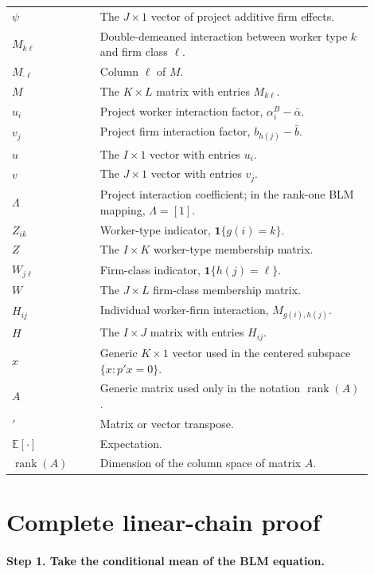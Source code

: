 \documentclass[11pt]{article}
\newcommand{\E}{\mathbb E}
\newcommand{\rank}{\operatorname{rank}}
\begin{document}
\begin{longtable}{
  >{\raggedright\arraybackslash}p{0.22\linewidth}
  >{\raggedright\arraybackslash}p{0.68\linewidth}}
\(\psi\) & The \(J\times1\) vector of project additive firm effects. \\
\(M_{k\ell}\) & Double-demeaned interaction between worker type \(k\) and firm class \(\ell\). \\
\(M_{\cdot\ell}\) & Column \(\ell\) of \(M\). \\
\(M\) & The \(K\times L\) matrix with entries \(M_{k\ell}\). \\
\(u_i\) & Project worker interaction factor, \(\alpha_i^B-\bar\alpha\). \\
\(v_j\) & Project firm interaction factor, \(b_{h(j)}-\bar b\). \\
\(u\) & The \(I\times1\) vector with entries \(u_i\). \\
\(v\) & The \(J\times1\) vector with entries \(v_j\). \\
\(\Lambda\) & Project interaction coefficient; in the rank-one BLM mapping, \(\Lambda=[1]\). \\
\(Z_{ik}\) & Worker-type indicator, \(\mathbf 1\{g(i)=k\}\). \\
\(Z\) & The \(I\times K\) worker-type membership matrix. \\
\(W_{j\ell}\) & Firm-class indicator, \(\mathbf 1\{h(j)=\ell\}\). \\
\(W\) & The \(J\times L\) firm-class membership matrix. \\
\(H_{ij}\) & Individual worker-firm interaction, \(M_{g(i),h(j)}\). \\
\(H\) & The \(I\times J\) matrix with entries \(H_{ij}\). \\
\(x\) & Generic \(K\times1\) vector used in the centered subspace \(\{x:p'x=0\}\). \\
\(A\) & Generic matrix used only in the notation \(\rank(A)\). \\
\('\) & Matrix or vector transpose. \\
\(\E[\cdot]\) & Expectation. \\
\(\rank(A)\) & Dimension of the column space of matrix \(A\). \\
\hline
\end{longtable}

\section*{Complete linear-chain proof}

\paragraph{Step 1. Take the conditional mean of the BLM equation.}
\end{document}
